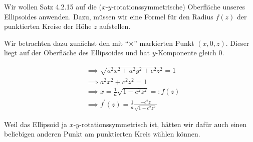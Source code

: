\begin{solution}

\phantom{}

\begin{center}
\end{center}


Wir wollen Satz 4.2.15 auf die ($x$-$y$-rotationssymmetrische) Oberfläche unseres Ellipsoides anwenden.
Dazu, müssen wir eine Formel für den Radius $f(z)$ der punktierten Kreise der Höhe $z$ aufstellen.

Wir betrachten dazu zunächst den mit \enquote{$\times$} markierten Punkt $(x, 0, z)$.
Dieser liegt auf der Oberfläche des Ellipsoides und hat $y$-Komponente gleich $0$.

\begin{align*}
    & \implies
    \sqrt{a^2 x^2 + a^2 y^2 + c^2 z^2} = 1 \\
    & \implies
    a^2 x^2 + c^2 z^2 = 1 \\
    & \implies
    x = \frac{1}{a} \sqrt{1 - c^2 z^2} =: f(z) \\
    & \implies
    f^\prime(z) = \frac{1}{a} \frac{-c^2 z}{\sqrt{1 - c^2 z^2}}
\end{align*}

Weil das Ellipsoid ja $x$-$y$-rotationssymmetrisch ist, hätten wir dafür auch einen beliebigen anderen Punkt am punktierten Kreis wählen können.


\end{solution}
